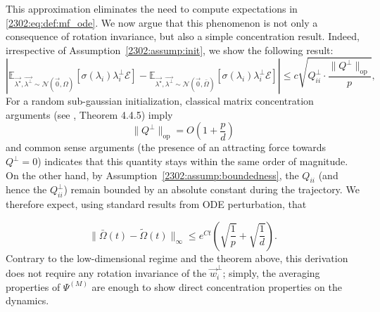 This approximation eliminates the need to compute expectations in \eqref{2302:eq:def:mf_ode}. We now argue that this phenomenon is not only a consequence of rotation invariance, but also a simple concentration result. Indeed, irrespective of Assumption~\ref{2302:assump:init}, we show the following result:
\begin{equation}\label{2302:eq:mf:concentration}
    \left|\mathbb E_{\vec{\lambda^\star}, \vec{\lambda^\bot} \sim \mathcal{N}(\vec{0}, \Omega)}\left[\sigma(\lambda_i)\lambda_i^\bot \mathcal E \right] - \mathbb E_{\vec{\lambda^\star}, \vec{\lambda^\bot} \sim \mathcal{N}(\vec{0}, \bar\Omega)}\left[\sigma(\lambda_i)\lambda_i^\bot \mathcal E \right]\right| \leq c \sqrt{Q^\bot_{ii} \cdot \frac{\lVert Q^\bot \rVert_{\mathrm{op}}}{p}},
\end{equation}
For a random sub-gaussian initialization, classical matrix concentration arguments (see \cite{vershynin2018high}, Theorem 4.4.5) imply
\[ \lVert Q^\bot \rVert_{\mathrm{op}} = O\left(1 + \frac pd \right) \]
and common sense arguments (the presence of an attracting force towards $Q^\bot = 0$) indicates that this quantity stays within the same order of magnitude. On the other hand, by Assumption~\ref{2302:assump:boundedness}, the $Q_{ii}$ (and hence the $Q_{ii}^\bot$) remain bounded by an absolute constant during the trajectory. We therefore expect, using standard results from ODE perturbation, that

\begin{equation}
    \lVert \bar\Omega(t) - \tilde\Omega(t) \rVert_\infty \leq e^{Ct}\left(\sqrt{\frac1p}+\sqrt{\frac1d}\right).
\end{equation}
Contrary to the low-dimensional regime and the theorem above, this derivation does not require any rotation invariance of the $\vec{w}_i^\bot$; simply, the averaging properties of $\Psi^{(M)}$ are enough to show direct concentration properties on the dynamics.

